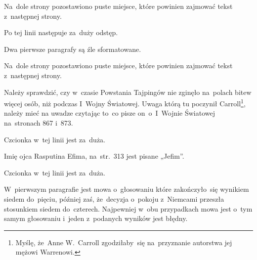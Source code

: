 \documentclass[a4paper,11pt]{article}
\begin{document}
\VerSpaceFour





\noindent
{} Na~dole strony pozostawiono puste miejsce, które powinien
zajmować tekst z~następnej strony.

\VerSpaceFour





\noindent
{} Po tej linii następuje za~duży odstęp.

\VerSpaceFour





\noindent
{} Dwa pierwsze paragrafy są źle sformatowane.

\VerSpaceFour





\noindent
{} Na~dole strony pozostawiono puste miejsce, które powinien
zajmować tekst z~następnej strony.

\VerSpaceFour





\noindent
{} Należy sprawdzić, czy w~czasie Powstania Tajpingów nie zginęło
na~polach bitew więcej osób, niż podczas I~Wojny Światowej. Uwaga którą tu
poczynił Carroll\footnote{Myślę, że~Anne W.~Carroll zgodziłaby~się
  na~przyznanie autorstwa jej mężowi Warrenowi.}, należy mieć na uwadze
czytając to~co pisze on~o~I~Wojnie Światowej na~stronach 867 i~873.

\VerSpaceFour





\noindent
{} Czcionka w~tej linii jest za~duża.

\VerSpaceFour





\noindent
{} Imię ojca Rasputina Efima, na~str.~313 jest pisane
„Jefim”.

\VerSpaceFour





\noindent
{} Czcionka w~tej linii jest za~duża.

\VerSpaceFour





\noindent
{} W~pierwszym paragrafie jest mowa o~głosowaniu które
zakończyło~się wynikiem siedem do~pięciu, później zaś, że~decyzja
o~pokoju z~Niemcami przeszła stosunkiem siedem do~czterech. Najpewniej
w~obu przypadkach mowa jest o~tym samym głosowaniu i~jeden z~podanych
wyników jest błędny.
\end{document}
